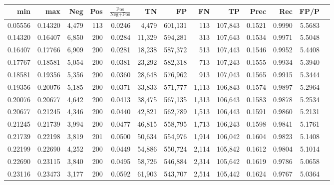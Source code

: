 \begin{tabular}{rrrrrrrrrrrrr}
\toprule
    min &     max &   Neg & Pos & $\frac{\text{Pos}}{\text{Neg}+\text{Pos}}$ &      TN &      FP &      FN &      TP &   Prec &    Rec &   FP/P \\
\midrule
0.05556 & 0.14320 & 4,479 & 113 &                                     0.0246 &   4,479 & 601,131 &     113 & 107,843 & 0.1521 & 0.9990 & 5.5683 \\
0.14320 & 0.16407 & 6,850 & 200 &                                     0.0284 &  11,329 & 594,281 &     313 & 107,643 & 0.1534 & 0.9971 & 5.5048 \\
0.16407 & 0.17766 & 6,909 & 200 &                                     0.0281 &  18,238 & 587,372 &     513 & 107,443 & 0.1546 & 0.9952 & 5.4408 \\
0.17767 & 0.18581 & 5,054 & 200 &                                     0.0381 &  23,292 & 582,318 &     713 & 107,243 & 0.1555 & 0.9934 & 5.3940 \\
0.18581 & 0.19356 & 5,356 & 200 &                                     0.0360 &  28,648 & 576,962 &     913 & 107,043 & 0.1565 & 0.9915 & 5.3444 \\
0.19356 & 0.20076 & 5,185 & 200 &                                     0.0371 &  33,833 & 571,777 &   1,113 & 106,843 & 0.1574 & 0.9897 & 5.2964 \\
0.20076 & 0.20677 & 4,642 & 200 &                                     0.0413 &  38,475 & 567,135 &   1,313 & 106,643 & 0.1583 & 0.9878 & 5.2534 \\
0.20677 & 0.21245 & 4,346 & 200 &                                     0.0440 &  42,821 & 562,789 &   1,513 & 106,443 & 0.1591 & 0.9860 & 5.2131 \\
0.21245 & 0.21739 & 3,994 & 200 &                                     0.0477 &  46,815 & 558,795 &   1,713 & 106,243 & 0.1598 & 0.9841 & 5.1761 \\
0.21739 & 0.22198 & 3,819 & 201 &                                     0.0500 &  50,634 & 554,976 &   1,914 & 106,042 & 0.1604 & 0.9823 & 5.1408 \\
0.22199 & 0.22690 & 4,252 & 200 &                                     0.0449 &  54,886 & 550,724 &   2,114 & 105,842 & 0.1612 & 0.9804 & 5.1014 \\
0.22690 & 0.23115 & 3,840 & 200 &                                     0.0495 &  58,726 & 546,884 &   2,314 & 105,642 & 0.1619 & 0.9786 & 5.0658 \\
0.23116 & 0.23473 & 3,177 & 200 &                                     0.0592 &  61,903 & 543,707 &   2,514 & 105,442 & 0.1624 & 0.9767 & 5.0364 \\

\end{tabular}
